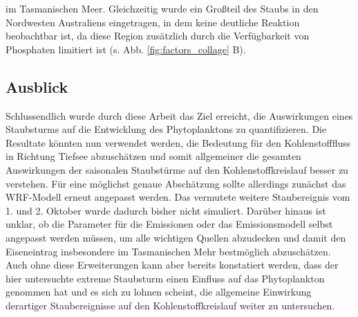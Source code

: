 \documentclass[12pt,a4paper,onecolumn]{scrartcl}
\begin{document}
im Tasmanischen Meer. Gleichzeitig wurde ein Großteil des Staubs in den Nordwesten Australiens eingetragen, in dem keine deutliche Reaktion beobachtbar ist, da diese Region zusätzlich durch die Verfügbarkeit von Phosphaten limitiert ist (s. Abb. \ref{fig:factors_collage} B).
\subsection{Ausblick}
Schlussendlich wurde durch diese Arbeit das Ziel erreicht, die Auswirkungen eines Staubsturms auf die Entwicklung des Phytoplanktons zu quantifizieren. Die Resultate könnten nun verwendet werden, die Bedeutung für den Kohlenstofffluss in Richtung Tiefsee abzuschätzen und somit allgemeiner die gesamten Auswirkungen der saisonalen Staubstürme auf den Kohlenstoffkreislauf besser zu verstehen. Für eine möglichst genaue Abschätzung sollte allerdings zunächst das WRF-Modell erneut angepasst werden. Das vermutete weitere Staubereignis vom 1. und 2. Oktober wurde dadurch bisher nicht simuliert. Darüber hinaus ist unklar, ob die Parameter für die Emissionen oder das Emissionsmodell selbst angepasst werden müssen, um alle wichtigen Quellen abzudecken und damit den Eiseneintrag insbesondere im Tasmanischen Mehr bestmöglich abzuschätzen. Auch ohne diese Erweiterungen kann aber bereits konstatiert werden, dass der hier untersuchte extreme Staubsturm einen Einfluss auf das Phytoplankton genommen hat und es sich zu lohnen scheint, die allgemeine Einwirkung derartiger Staubereignisse auf den Kohlenstoffkreislauf weiter zu untersuchen.

\newpage
{}
\begin{singlespace} %
\printbibliography
\end{singlespace}
\appendix

\newpage
\end{document}
